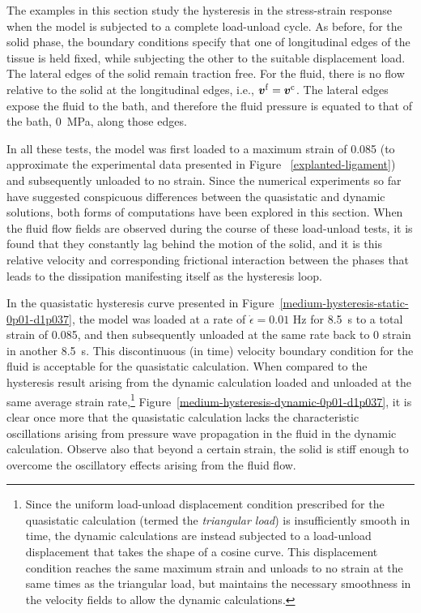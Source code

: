 The examples in this section study the hysteresis in the stress-strain
response when the model is subjected to a complete load-unload
cycle. As before, for the solid phase, the boundary conditions specify
that one of longitudinal edges of the tissue is held fixed, while
subjecting the other to the suitable displacement load. The lateral
edges of the solid remain traction free. For the fluid, there is no
flow relative to the solid at the longitudinal edges, i.e.,
$\mbox{\boldmath$ v$}^{\mathrm{f}} = \mbox{\boldmath$ v$}^{\mathrm{c}}$. The lateral edges expose the
fluid to the bath, and therefore the fluid pressure is equated to that
of the bath, 0~MPa, along those edges.

In all these tests, the model was first loaded to a maximum strain of
0.085 (to approximate the experimental data presented in Figure~%
\ref{explanted-ligament}) and subsequently unloaded to no
strain. Since the numerical experiments so far have suggested conspicuous
differences between the quasistatic and dynamic solutions, both forms
of computations have been explored in this section. When the fluid
flow fields are observed during the course of these load-unload tests,
it is found that they constantly lag behind the motion of the solid,
and it is this relative velocity and corresponding frictional
interaction between the phases that leads to the dissipation
manifesting itself as the hysteresis loop.

In the quasistatic hysteresis curve presented in
Figure~\ref{medium-hysteresis-static-0p01-d1p037}, the model was
loaded at a rate of $\dot{\epsilon}=0.01$ Hz for 8.5~s to a total
strain of 0.085, and then subsequently unloaded at the same rate back
to 0 strain in another 8.5~s. This discontinuous (in time) velocity
boundary condition for the fluid is acceptable for the quasistatic
calculation. When compared to the hysteresis result arising from the
dynamic calculation loaded and unloaded at the same average strain
rate,\footnote{Since the uniform load-unload displacement condition
  prescribed for the quasistatic calculation (termed the {\em triangular
    load}) is insufficiently smooth in time, the dynamic calculations
  are instead subjected to a load-unload displacement that takes the
  shape of a cosine curve. This displacement condition reaches the
  same maximum strain and unloads to no strain at the same times as
  the triangular load, but maintains the necessary smoothness in the
  velocity fields to allow the dynamic calculations.}
Figure~\ref{medium-hysteresis-dynamic-0p01-d1p037}, it is clear once
more that the quasistatic calculation lacks the characteristic
oscillations arising from pressure wave propagation in the fluid in
the dynamic calculation. Observe also that beyond a certain strain,
the solid is stiff enough to overcome the oscillatory effects arising
from the fluid flow.

